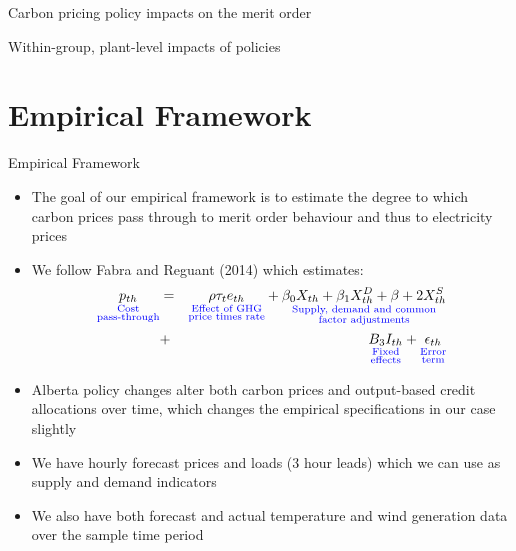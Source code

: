 \documentclass{beamer}
\begin{document}
\begin{frame}{Carbon pricing policy impacts on the merit order}
   \vfill
\end{frame}


\begin{frame}{Within-group, plant-level impacts of policies}
   \vfill
\end{frame}


\section{Empirical Framework}
\begin{frame}{Empirical Framework}
    \begin{block}{}
    \begin{itemize}
    \item The goal of our empirical framework is to estimate the degree to which carbon prices pass through to merit order behaviour and thus to electricity prices
    \item We follow Fabra and Reguant (2014) which estimates:
    \begin{eqnarray*}\label{eq:production}
    \underset{\color{blue}\substack{\text{Cost}\\{\text{pass-through}}}} {p_{th}} &=&\underset{\color{blue}\substack{\text{Effect of GHG}\\{\text{price times rate}}}} {\rho\tau_te_{th}}
    +\underset{\color{blue}\substack{\text{Supply, demand and common}\\{\text{factor adjustments}}}} {\beta_0X_{th}+\beta_1X_{th}^D+\beta+2X_{th}^S}\\&+&
    \underset{\color{blue}\substack{\text{Fixed}\\{\text{effects}}}}{B_3I_{th}}
    + \underset{\color{blue}\substack{\text{Error}\\{\text{term}}}}{\epsilon_{th}}
    \end{eqnarray*}
    \item Alberta policy changes alter both carbon prices and output-based credit allocations over time, which changes the empirical specifications in our case slightly
    \item We have hourly forecast prices and loads (3 hour leads) which we can use as supply and demand indicators
    \item We also have both forecast and actual temperature and wind generation data over the sample time period
    \end{itemize}
  \end{block}
   \vfill
\end{frame}
\end{document}
